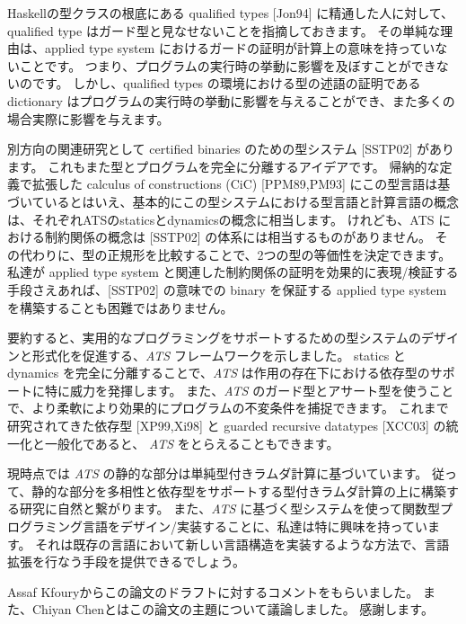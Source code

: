 \documentclass[submit,techreq,noauthor,onecolumn]{ipsj}
\begin{document}
Haskellの型クラスの根底にある qualified types [Jon94] に精通した人に対して、qualified type はガード型と見なせないことを指摘しておきます。
その単純な理由は、applied type system におけるガードの証明が計算上の意味を持っていないことです。
つまり、プログラムの実行時の挙動に影響を及ぼすことができないのです。
しかし、qualified types の環境における型の述語の証明である dictionary はプログラムの実行時の挙動に影響を与えることができ、また多くの場合実際に影響を与えます。

別方向の関連研究として certified binaries のための型システム [SSTP02] があります。
これもまた型とプログラムを完全に分離するアイデアです。
帰納的な定義で拡張した calculus of constructions (CiC) [PPM89,PM93] にこの型言語は基づいているとはいえ、基本的にこの型システムにおける型言語と計算言語の概念は、それぞれATSのstaticsとdynamicsの概念に相当します。
けれども、ATS における制約関係の概念は [SSTP02] の体系には相当するものがありません。
その代わりに、型の正規形を比較することで、2つの型の等価性を決定できます。
私達が applied type system と関連した制約関係の証明を効果的に表現/検証する手段さえあれば、[SSTP02] の意味での binary を保証する applied type system を構築することも困難ではありません。

要約すると、実用的なプログラミングをサポートするための型システムのデザインと形式化を促進する、{\it ATS} フレームワークを示しました。
statics と dynamics を完全に分離することで、{\it ATS} は作用の存在下における依存型のサポートに特に威力を発揮します。
また、{\it ATS} のガード型とアサート型を使うことで、より柔軟により効果的にプログラムの不変条件を捕捉できます。
これまで研究されてきた依存型 [XP99,Xi98] と guarded recursive datatypes [XCC03] の統一化と一般化であると、 {\it ATS} をとらえることもできます。

現時点では {\it ATS} の静的な部分は単純型付きラムダ計算に基づいています。
従って、静的な部分を多相性と依存型をサポートする型付きラムダ計算の上に構築する研究に自然と繋がります。
また、{\it ATS} に基づく型システムを使って関数型プログラミング言語をデザイン/実装することに、私達は特に興味を持っています。
それは既存の言語において新しい言語構造を実装するような方法で、言語拡張を行なう手段を提供できるでしょう。

\begin{acknowledgment}
Assaf Kfouryからこの論文のドラフトに対するコメントをもらいました。
また、Chiyan Chenとはこの論文の主題について議論しました。
感謝します。
\end{acknowledgment}

\end{document}
